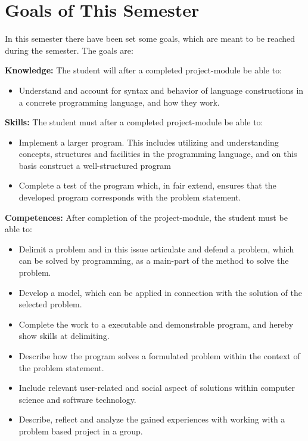 \section{Goals of This Semester}
In this semester there have been set some goals, which are meant to be reached during the semester. The goals are: 

\textbf{Knowledge:} \newline
	The student will after a completed project-module be able to:
	\begin{itemize}
			\item Understand and account for syntax and behavior of language constructions in a concrete programming language, and how they work.
	\end{itemize}

\textbf{Skills:} \newline
	The student must after a completed project-module be able to:
	\begin{itemize}
		\item Implement a larger program. This includes utilizing and understanding concepts, structures and facilities in the programming language, and on this basis construct a well-structured program
		\item Complete a test of the program which, in fair extend, ensures that the developed program corresponds with the problem statement. 
	\end{itemize}

\textbf{Competences:} \newline
	After completion of the project-module, the student must be able to:
	\begin{itemize}
		\item Delimit a problem and in this issue articulate and defend a problem, which can be solved by programming, as a main-part of the method to solve the problem.	
		\item Develop a model, which can be applied in connection with the solution of the selected problem. 
		\item Complete the work to a executable and demonstrable program, and hereby show skills at delimiting. 
		\item Describe how the program solves a formulated problem within the context of the problem statement. 
		\item Include relevant user-related and social aspect of solutions within computer science and software technology.
		\item Describe, reflect and analyze the gained experiences with working with a problem based project in a group.
	\end{itemize}


